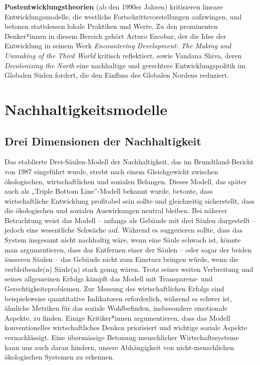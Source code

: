 \documentclass[
  nswissgerman,
  a4paper,
  openany]{book}
\begin{document}
\begin{tcolorbox}
\textbf{Postentwicklungstheorien} (ab den 1990er Jahren) kritisieren
lineare Entwicklungsmodelle, die westliche Fortschrittsvorstellungen
aufzwingen, und betonen stattdessen lokale Praktiken und Werte. Zu den
prominenten Denker*innen in diesem Bereich gehört Arturo Escobar, der
die Idee der Entwicklung in seinem Werk \emph{Encountering Development:
The Making and Unmaking of the Third World} kritisch reflektiert, sowie
Vandana Shiva, deren \emph{Decolonizing the North} eine nachhaltige und
gerechtere Entwicklungspolitik im Globalen Süden fordert, die den
Einfluss des Globalen Nordens reduziert.

\end{tcolorbox}

\section{Nachhaltigkeitsmodelle}\label{nachhaltigkeitsmodelle}

\subsection{Drei Dimensionen der
Nachhaltigkeit}\label{drei-dimensionen-der-nachhaltigkeit}

Das etablierte Drei-Säulen-Modell der Nachhaltigkeit, das im
Brundtland-Bericht von 1987 eingeführt wurde, strebt nach einem
Gleichgewicht zwischen ökologischen, wirtschaftlichen und sozialen
Belangen. Dieses Modell, das später auch als „Triple Bottom
Line''-Modell bekannt wurde, betonte, dass wirtschaftliche Entwicklung
profitabel sein sollte und gleichzeitig sicherstellt, dass die
ökologischen und sozialen Auswirkungen neutral bleiben. Bei näherer
Betrachtung weist das Modell -- anfangs als Gebäude mit drei Säulen
dargestellt -- jedoch eine wesentliche Schwäche auf. Während es
suggerieren sollte, dass das System insgesamt nicht nachhaltig wäre,
wenn eine Säule schwach ist, könnte man argumentieren, dass das
Entfernen einer der Säulen -- oder sogar der beiden äusseren Säulen --
das Gebäude nicht zum Einsturz bringen würde, wenn die verbleibende(n)
Säule(n) stark genug wären. Trotz seiner weiten Verbreitung und seines
allgemeinen Erfolgs kämpft das Modell mit Transparenz- und
Gerechtigkeitsproblemen. Zur Messung des wirtschaftlichen Erfolgs sind
beispielsweise quantitative Indikatoren erforderlich, während es schwer
ist, ähnliche Metriken für das soziale Wohlbefinden, insbesondere
emotionale Aspekte, zu finden. Einige Kritiker*innen argumentieren, dass
das Modell konventionelles wirtschaftliches Denken priorisiert und
wichtige soziale Aspekte vernachlässigt. Eine übermässige Betonung
menschlicher Wirtschaftssysteme kann uns auch daran hindern, unsere
Abhängigkeit von nicht-menschlichen ökologischen Systemen zu erkennen.
\end{document}
